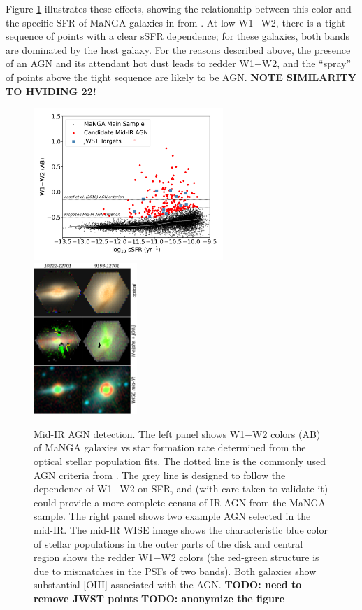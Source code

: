 \documentclass[12pt, preprint]{hacked-aastex}
\begin{document}
Figure \ref{fig:wise} illustrates these effects, showing the
relationship between this color and the specific SFR of MaNGA galaxies
in from \cite{sanchez22a}.  At low W1$-$W2, there is a tight sequence
of points with a clear sSFR dependence; for these galaxies, both bands
are dominated by the host galaxy.  For the reasons described above,
the presence of an AGN and its attendant hot dust leads to redder
W1$-$W2, and the ``spray'' of points above the tight sequence are
likely to be AGN.  {\bf NOTE SIMILARITY TO HVIDING 22!}

\begin{figure}[t!]
\includegraphics[width=0.64\textwidth]{w1w2-vs-ssfr.png}
\includegraphics[width=0.35\textwidth]{ir-grid.drawio.png}
  \vspace{-22pt}
    \caption{
\label{fig:wise} \small Mid-IR AGN detection. 
The left panel shows W1$-$W2 colors (AB) of MaNGA galaxies vs star
formation rate determined from the optical stellar population fits.
The dotted line is the commonly used AGN criteria from
\cite{assef18a}.  The grey line is designed to follow the dependence
of W1$-$W2 on SFR, and (with care taken to validate it) could provide
a more complete census of IR AGN from the MaNGA sample. The right
panel shows two example AGN selected in the mid-IR.  The mid-IR WISE
image shows the characteristic blue color of stellar populations in
the outer parts of the disk and central region shows the redder
W1$-$W2 colors (the red-green structure is due to mismatches in the
PSFs of two bands).  Both galaxies show substantial [OIII] associated
with the AGN.  {\bf TODO: need to remove JWST points} {\bf TODO:
  anonymize the figure}}
\end{figure}
\end{document}
